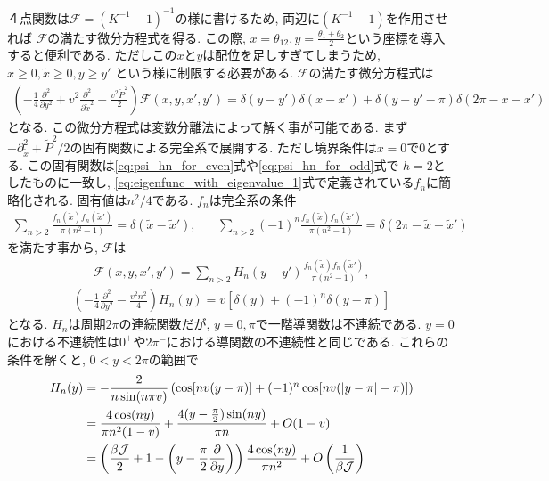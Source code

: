 ４点関数は$\mathcal{F} = (K^{-1} - 1)^{-1}$の様に書けるため, 両辺に$(K^{-1} - 1)$を作用させれば
$\mathcal{F}$の満たす微分方程式を得る. 
この際, $x = \theta_{12}, y = \frac{\theta_1 + \theta_2}{2}$という座標を導入すると便利である. 
ただしこの$x$と$y$は配位を足しすぎてしまうため, $x \geq 0, \tilde{x} \geq 0, y \geq y'$
という様に制限する必要がある. 
$\mathcal{F}$の満たす微分方程式は
\begin{align}
	\left(
		- \frac{1}{4}\frac{\partial^2}{\partial y^2}
		+ v^2\frac{\partial^2}{\partial \tilde{x}^2}
		- \frac{v^2\tilde{P}^2}{2}
	\right)\mathcal{F}(x, y, x', y')
	= \delta(y - y')\delta(x - x') + \delta(y - y' - \pi)\delta(2\pi - x - x')
\end{align}
となる. 
この微分方程式は変数分離法によって解く事が可能である. 
まず$-\partial^2_{\tilde{x}} + \tilde{P}^2 / 2$の固有関数による完全系で展開する. 
ただし境界条件は$x = 0$で0とする. 
この固有関数は\eqref{eq:psi_hn_for_even}式や\eqref{eq:psi_hn_for_odd}式で
$h=2$としたものに一致し, 
\eqref{eq:eigenfunc_with_eigenvalue_1}式で定義されている$f_n$に簡略化される. 
固有値は$n^2/4$である. 
$f_n$は完全系の条件
\begin{align}
	\sum_{n>2}\frac{f_n(\tilde{x})f_n(\tilde{x}')}{\pi(n^2 - 1)}
	= \delta(\tilde{x} - \tilde{x}'),\hspace{20pt}
	\sum_{n>2}(-1)^n\frac{f_n(\tilde{x})f_n(\tilde{x}')}{\pi(n^2 - 1)}
	= \delta(2\pi - \tilde{x} - \tilde{x}')
\end{align}
を満たす事から, $\mathcal{F}$は
\begin{align}
	\mathcal{F}(x, y, x', y')
	= \sum_{n>2}H_n(y - y')\frac{f_n(\tilde{x})f_n(\tilde{x}')}{\pi(n^2 - 1)},
	\label{eq:h2_contribution_for_fourpointfunc_in_large_q}
\end{align}
\begin{align}
	\left(-\frac{1}{4}\frac{\partial^2}{\partial y^2} - \frac{v^2n^2}{4}\right)H_n(y)
	= v[\delta(y) + (-1)^n\delta(y-\pi)]
\end{align}
となる. 
$H_n$は周期$2\pi$の連続関数だが, $y=0, \pi$で一階導関数は不連続である. 
$y=0$における不連続性は$0^+$や$2\pi^-$における導関数の不連続性と同じである. 
これらの条件を解くと, $0 < y < 2\pi$の範囲で
\begin{align}
	H_n(y)
	&= -\frac{2}{n\sin(n\pi v)}
	\left(
		\cos[nv(y - \pi)] + (-1)^n\cos[nv(|y-\pi| - \pi)]
	\right)\\
	&= \frac{4\cos(ny)}{\pi n^2(1-v)}
		+ \frac{4(y-\frac{\pi}{2})\sin(ny)}{\pi n} + O(1 - v)\\
	&= \left(
			\frac{\beta\mathcal{J}}{2} + 1 - \left(y - \frac{\pi}{2}\frac{\partial}{\partial y}\right)	
		\right)\frac{4\cos(ny)}{\pi n^2} + O\left(\frac{1}{\beta\mathcal{J}}\right)
\end{align}
